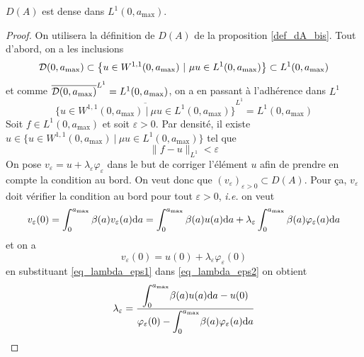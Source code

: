 \begin{proposition}
    $D(A)$ est dense dans $L^1(0,a_{\max})$.
\end{proposition}

\begin{proof}
    On utilisera la définition de $D(A)$ de la proposition \ref{def_dA_bis}. Tout d'abord, on a les inclusions 
    \begin{equation*}
        \mathcal{D}(0,a_{\max}) \subset \big\{ u \in W^{1,1}(0,a_{\max}) \ | \ \mu u \in L^1(0,a_{\max})\big\} \subset L^1(0,a_{\max})
    \end{equation*}
    et comme $\overline{\mathcal{D}(0,a_{\max})}^{L^1} = L^1(0,a_{\max})$, on a en passant à l'adhérence dans $L^1$
    \begin{equation*}
        \overline{\big\{ u \in W^{1,1}(0,a_{\max}) \ | \ \mu u \in L^1(0,a_{\max})\big\}}^{L^1} = L^1(0,a_{\max})
    \end{equation*}
    Soit $f \in L^1(0,a_{\max})$ et soit $\varepsilon >0$. Par densité, il existe $u \in \big\{ u \in W^{1,1}(0,a_{\max}) \ | \ \mu u \in L^1(0,a_{\max})\big\}$ tel que 
    \begin{equation*}
        \|f-u\|_{L^1} < \varepsilon
    \end{equation*}
    On pose $v_{\varepsilon} = u+\lambda_{\varepsilon} \varphi_{\varepsilon}$ dans le but de \og corriger \fg{} l'élément $u$ afin de prendre en compte la condition au bord. On veut donc que $(v_{\varepsilon})_{\varepsilon >0} \subset D(A)$. Pour ça, $v_{\varepsilon}$ doit vérifier la condition au bord pour tout $\varepsilon >0$, \textit{i.e.} on veut 
    \begin{equation}\label{eq_lambda_eps1}
        v_{\varepsilon}(0) = \int_0^{a_{\max}} \beta(a)v_{\varepsilon}(a)\mathrm{d} a = \int_0^{a_{\max}}\beta(a)u(a)\mathrm{d} a + \lambda_{\varepsilon}\int_0^{a_{\max}} \beta(a)\varphi_{\varepsilon}(a)\mathrm{d} a
    \end{equation}
    et on a 
    \begin{equation}\label{eq_lambda_eps2}
        v_{\varepsilon}(0) = u(0)+\lambda_{\varepsilon}\varphi_{\varepsilon}(0)
    \end{equation}
    en substituant \eqref{eq_lambda_eps1} dans \eqref{eq_lambda_eps2} on obtient
    \begin{equation*}
        \lambda_{\varepsilon} = \frac{\displaystyle{\int_0^{a_{\max}}} \beta(a)u(a)\mathrm{d} a - u(0)}{\varphi_{\varepsilon}(0)-\displaystyle{\int_0^{a_{\max}}} \beta(a)\varphi_{\varepsilon}(a)\mathrm{d} a}
    \end{equation*}

\end{proof}
